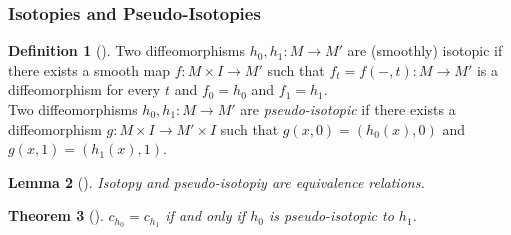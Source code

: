 \documentclass[reqno]{amsart}
\newtheorem{theorem}{Theorem}[section]
\newtheorem{lemma}[theorem]{Lemma}
\theoremstyle{definition}
\newtheorem{definition}[theorem]{Definition}
\theoremstyle{remark}
\begin{document}
    \subsubsection{Isotopies and Pseudo-Isotopies}

    \begin{definition}[]
        Two diffeomorphisms
        $h_0,h_1 \colon M \to M'$ are
        (smoothly) isotopic if there exists a smooth map
        $f \colon M \times I \to M'$
        such that
        $f_t = f(-,t) \colon M \to M'$ is a diffeomorphism
        for every $t$ and
        $f_0 = h_0$ and $f_1 = h_1$.\\
        Two diffeomorphisms
        $h_0,h_1 \colon M \to M'$ are
        \textit{pseudo-isotopic} if there exists
        a diffeomorphism
        $g \colon M \times I \to M' \times I$ such that
        $g(x,0) = \left( h_0(x), 0 \right) $ and
        $g(x,1) = \left( h_1(x),1 \right) $.
    \end{definition}
    \begin{lemma}[]
        Isotopy and pseudo-isotopiy are equivalence
        relations.
    \end{lemma}

    \begin{theorem}[]
        $c_{h_0} = c_{h_1}$ if and only if
        $h_0$ is pseudo-isotopic to $h_1$.
    \end{theorem}
\end{document}
